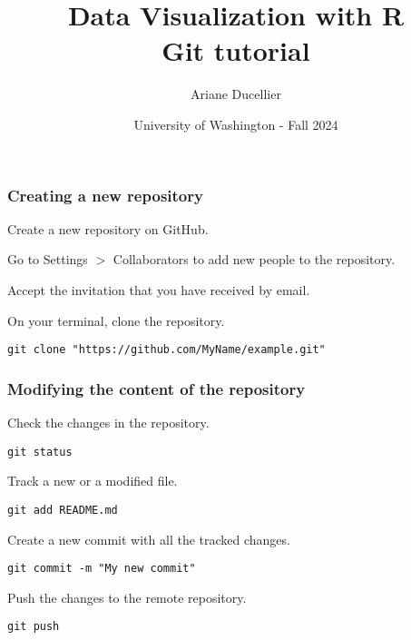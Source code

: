 \documentclass{beamer}
\title[Data Visualization with R - Git tutorial]{Data Visualization with R \\ Git tutorial}
\author{Ariane Ducellier}
\date{University of Washington - Fall 2024}
\begin{document}
	\begin{frame}
		\titlepage
	\end{frame}

	\begin{frame}[fragile]
		\frametitle{Creating a new repository}

		Create a new repository on GitHub.

		\vspace{1em}
		
		Go to Settings $>$ Collaborators to add new people to the repository.

		\vspace{1em}

		Accept the invitation that you have received by email.

		\vspace{1em}

		On your terminal, clone the repository.

		\begin{exampleblock}{}
		\begin{BVerbatim}
git clone "https://github.com/MyName/example.git"
		\end{BVerbatim}
		\end{exampleblock}{}
	\end{frame}

	\begin{frame}[fragile]
		\frametitle{Modifying the content of the repository}

		Check the changes in the repository.

		\begin{exampleblock}{}
		\begin{BVerbatim}
git status
		\end{BVerbatim}
		\end{exampleblock}{}
	
		Track a new or a modified file.

		\begin{exampleblock}{}
		\begin{BVerbatim}
git add README.md
		\end{BVerbatim}
		\end{exampleblock}{}

		Create a new commit with all the tracked changes.

		\begin{exampleblock}{}
		\begin{BVerbatim}
git commit -m "My new commit"
		\end{BVerbatim}
		\end{exampleblock}{}

		Push the changes  to the remote repository.

		\begin{exampleblock}{}
		\begin{BVerbatim}
git push
		\end{BVerbatim}
		\end{exampleblock}{}
	\end{frame}
\end{document}

